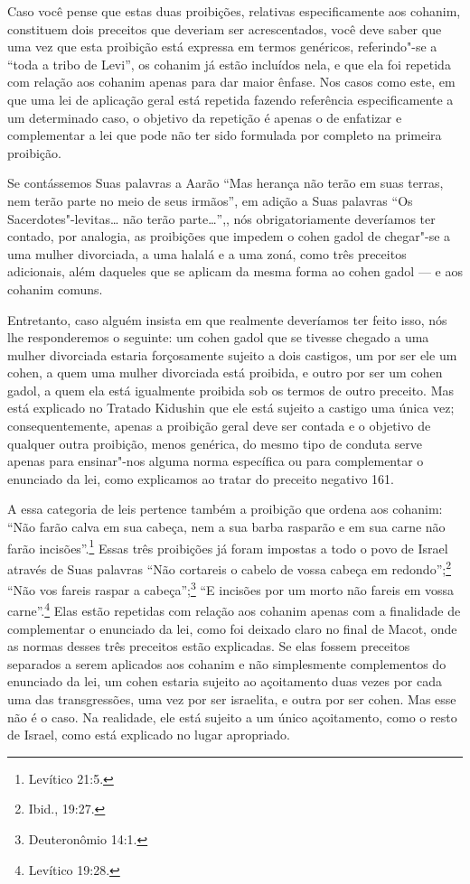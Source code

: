 \begin{multicols}{2}
Caso você pense que estas duas proibições, relativas especificamente
aos cohanim\starr, constituem dois preceitos que deveriam ser
acrescentados, você deve saber que uma vez que esta proibição está
expressa em termos genéricos, referindo"-se a ``toda a tribo de Levi\starr'',
os cohanim\starr{} já estão incluídos nela, e que ela foi repetida com
relação aos cohanim\starr{} apenas para dar maior ênfase. Nos casos como
este, em que uma lei de aplicação geral está repetida fazendo referência
especificamente a um determinado caso, o objetivo da repetição é apenas
o de enfatizar e complementar a lei que pode não ter sido formulada por
completo na primeira proibição.

Se contássemos Suas palavras a Aarão ``Mas herança não terão em suas
terras, nem terão parte no meio de seus irmãos'', em adição a Suas
palavras ``Os Sacerdotes"-levitas\starr\ldots{} não terão parte\ldots{}'',, nós
obrigatoriamente deveríamos ter contado, por analogia, as proibições
que impedem o cohen gadol\starr{} de chegar"-se a uma mulher divorciada, a
uma halalá\starr{} e a uma zoná\starr, como três preceitos adicionais, além
daqueles que se aplicam da mesma forma ao cohen gadol\starr{} --- e aos
cohanim\starr{} comuns.

Entretanto, caso alguém insista em que realmente deveríamos ter feito
isso, nós lhe responderemos o seguinte: um cohen
gadol\starr{} que se tivesse chegado a uma mulher divorciada estaria
forçosamente sujeito a dois castigos, um por ser ele um cohen\starr, a
quem uma mulher divorciada está proibida, e outro por ser um cohen
gadol\starr, a quem ela está igualmente proibida sob os termos de outro
preceito. Mas está explicado no Tratado Kidushin\starr{} que ele está sujeito a
castigo uma única vez; consequentemente, apenas a proibição geral deve
ser contada e o objetivo de qualquer outra proibição, menos genérica, do
mesmo tipo de conduta serve apenas para ensinar"-nos alguma norma
específica ou para complementar o enunciado da lei, como explicamos ao
tratar do preceito negativo 161.

A essa categoria de leis pertence também a proibição que ordena aos
cohanim\starr: ``Não farão calva em sua cabeça, nem a sua barba rasparão e
em sua carne não farão incisões''.\footnote{Levítico 21:5.} Essas três proibições
já foram impostas a todo o povo de Israel através de Suas palavras
``Não cortareis o cabelo de vossa cabeça em redondo'';\footnote{Ibid., 19:27.}
``Não vos fareis raspar a cabeça'';\footnote{Deuteronômio 14:1.} ``E incisões por
um morto não fareis em vossa carne''.\footnote{Levítico 19:28.} Elas estão
repetidas com relação aos cohanim\starr{} apenas com a finalidade de
complementar o enunciado da lei, como foi deixado claro no final de
Macot\starr, onde as normas desses três preceitos estão explicadas. Se elas
fossem preceitos separados a serem aplicados aos cohanim\starr{} e não
simplesmente complementos do enunciado da lei, um cohen\starr{} estaria
sujeito ao açoitamento duas vezes por cada uma das transgressões, uma
vez por ser israelita, e outra por ser cohen\starr. Mas esse não é o caso.
Na realidade, ele está sujeito a um único açoitamento, como o resto de
Israel, como está explicado no lugar apropriado.


\end{multicols}
